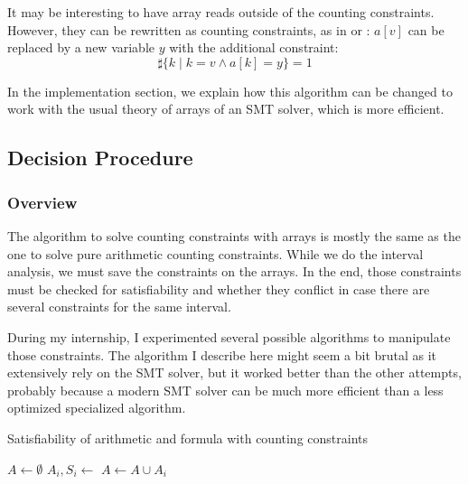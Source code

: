 It may be interesting to have array reads outside of the counting
constraints. However, they can be rewritten as counting constraints, as in
\cite{bradley2006s} or
\cite{AlbertiGP16}: $a[v]$ can be replaced by a new variable $y$ with the additional constraint:
\begin{equation}
\sharp\{k\mid k = v \land a[k] = y\} = 1
\end{equation}

In the implementation section, we explain
how this algorithm can be changed to work with the usual theory of arrays of an
SMT solver, which is more efficient.

\subsection{Decision Procedure}

\subsubsection{Overview}

The algorithm to solve counting constraints with arrays is mostly the
same as the one to solve pure arithmetic counting constraints. While we do the interval analysis,
we must save the constraints on the arrays. In the end, those constraints must be checked for
satisfiability and whether they conflict in case there are several constraints for the same interval.

During my internship, I experimented several possible algorithms to
manipulate those constraints. The algorithm I describe here might seem a
bit brutal as it extensively rely on the SMT solver, but it
worked better than the other attempts, probably because a modern SMT
solver can be much more efficient than a less optimized specialized
algorithm.

\begin{algorithm}[h]
\caption{Satisfiability of arithmetic and formula with counting constraints}
\begin{algorithmic}[1]
\State {}
    \State {}
    \State $A \gets \emptyset$
        \State $A_i, S_i \gets $ 
        \State $A \gets A \cup A_i$
            \State {}
            \State {}
        \EndIf
    \EndFor
    \State {}
    \State {}
    \State {}
    \State {}
    \State {}
    \State {}
        \State {}
        \State {}
    \EndIf
    \State {}
    \State {}
\EndWhile
\State {}
\end{algorithmic}
\label{arrayalgo}
\end{algorithm}

